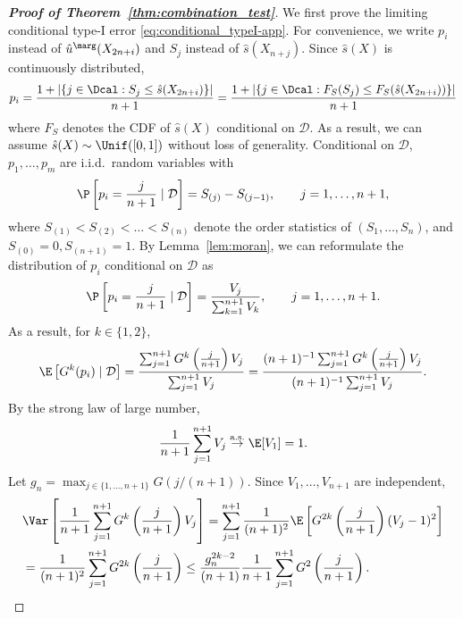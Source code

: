 \begin{proof}[\textbf{Proof of Theorem~\ref{thm:combination_test}}]
We first prove the limiting conditional type-I error \eqref{eq:conditional_typeI-app}. For convenience, we write $p_i$ instead of $\hat{u}^\marg(X_{2n+i})$ and $S_j$ instead of $\hat{s}(X_{n+j})$. Since $\hat{s}(X)$ is continuously distributed,
\[
p_i = \frac{1 + |\{j\in \Dcal: S_{j} \le \hat{s}(X_{2n+i}) \}|}{n + 1} = \frac{1 + |\{j\in \Dcal: F_{S}(S_{j}) \le F_{S}(\hat{s}(X_{2n+i})) \}|}{n + 1}\]
where $F_{S}$ denotes the CDF of $\hat{s}(X)$ conditional on $\mathcal{D}$. As a result, we can assume $\hat{s}(X)\sim \Unif([0, 1])$ without loss of generality. Conditional on $\mathcal{D}$, $p_1, \ldots, p_{m}$ are i.i.d.~random variables with
\[\P\left[p_i = \frac{j}{n+1}\mid \mathcal{D} \right] = S_{(j)} - S_{(j-1)}, \qquad j = 1,\ldots, n+1,
\]
where $S_{(1)} < S_{(2)} < \ldots < S_{(n)}$ denote the order statistics of $(S_1, \ldots, S_{n})$, and $S_{(0)} = 0, S_{(n + 1)}= 1$. By Lemma~\ref{lem:moran}, we can reformulate the distribution of $p_i$ conditional on $\mathcal{D}$ as
\begin{equation}\label{eq:pi_dist}
    \P\left[p_i = \frac{j}{n+1}\mid \mathcal{D}\right] = \frac{V_{j}}{\sum_{k=1}^{n+1}V_{k}}, \qquad j = 1,\ldots, n+1.
\end{equation}
As a result, for $k \in \{1, 2\}$,
\begin{align}\label{eq:EGk}
\E\left[G^k(p_i)\mid \mathcal{D}\right] = \frac{\sum_{j=1}^{n+1}G^k\left(\frac{j}{n+1}\right)V_{j}}{\sum_{j=1}^{n+1}V_{j}} = \frac{(n+1)^{-1}\sum_{j=1}^{n+1}G^k\left(\frac{j}{n+1}\right)V_{j}}{(n+1)^{-1}\sum_{j=1}^{n+1}V_{j}}.
\end{align}
By the strong law of large number,
\begin{equation}\label{eq:LLN_sumV}
\frac{1}{n+1}\sum_{j=1}^{n+1}V_{j}\stackrel{\mathrm{a.s.}}{\rightarrow}\E[V_{1}] = 1.
\end{equation}
Let $g_{n} = \max_{j\in \{1, \ldots, n+1\}}G(j / (n + 1))$. Since $V_1, \ldots, V_{n+1}$ are independent,
\begin{align}
&\Var\left[\frac{1}{n+1}\sum_{j=1}^{n+1}G^k\left(\frac{j}{n+1}\right)V_{j}\right] = \sum_{j=1}^{n+1}\frac{1}{(n + 1)^2}\E\left[G^{2k}\left(\frac{j}{n+1}\right)(V_{j} - 1)^2\right]\nonumber\\
& = \frac{1}{(n + 1)^2}\sum_{j=1}^{n + 1}G^{2k}\left(\frac{j}{n+1}\right)\le \frac{g_{n}^{2k - 2}}{(n + 1)}\frac{1}{n+1}\sum_{j=1}^{n + 1}G^{2}\left(\frac{j}{n+1}\right).\label{eq:G2k}
\end{align}

\end{proof}
